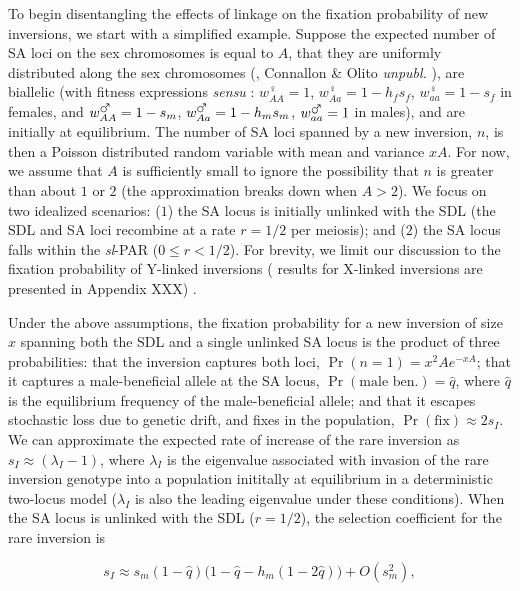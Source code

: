 \documentclass{article}
\newcommand\hl[1]{%
  \bgroup
  \hskip0pt\color{blue!80!black}%
  #1%
  \egroup
}
\begin{document}
To begin disentangling the effects of linkage on the fixation probability of new inversions, we start with a simplified example. Suppose the expected number of SA loci on the sex chromosomes is equal to $A$, that they are uniformly distributed along the sex chromosomes (\citealt{vanValenLevins1968}, \hl{Connallon \& Olito {\itshape unpubl.}}), are biallelic (with fitness expressions {\itshape sensu} \citealt{Kidwell1977}: $w^{\female}_{AA} = 1$, $w^{\female}_{Aa}=1 - h_f s_f$, $w^{\female}_{aa} = 1 - s_f$ in females, and $w^{\mars}_{AA} = 1 - s_m$, $w^{\mars}_{Aa}=1 - h_m s_m$, $w^{\mars}_{aa} = 1$ in males), and are initially at equilibrium. The number of SA loci spanned by a new inversion, $n$, is then a Poisson distributed random variable with mean and variance $xA$. For now, we assume that $A$ is sufficiently small to ignore the possibility that $n$ is greater than about $1$ or $2$ (the approximation breaks down when $A > 2$). We focus on two idealized scenarios: ($1$) the SA locus is initially unlinked with the SDL (the SDL and SA loci recombine at a rate $r = 1/2$ per meiosis); and ($2$) the SA locus falls within the {\itshape sl}-PAR ($0 \leq r < 1/2$). For brevity, we limit our discussion to the fixation probability of Y-linked inversions (\hl{results for X-linked inversions are presented in Appendix XXX)}.

Under the above assumptions, the fixation probability for a new inversion of size $x$ spanning both the SDL and a single unlinked SA locus is the product of three probabilities: that the inversion captures both loci, $\Pr(n = 1) = x^2 A e^{-xA}$; that it captures a male-beneficial allele at the SA locus, $\Pr(\text{male~ben.}) = \hat{q}$, where $\hat{q}$ is the equilibrium frequency of the male-beneficial allele; and that it escapes stochastic loss due to genetic drift, and fixes in the population, $\Pr(\text{fix}) \approx 2 s_I$. We can approximate the expected rate of increase of the rare inversion as $s_I \approx (\lambda_I - 1)$, where $\lambda_I$ is the eigenvalue associated with invasion of the rare inversion genotype into a population inititally at equilibrium in a deterministic two-locus model ($\lambda_I$ is also the leading eigenvalue under these conditions). When the SA locus is unlinked with the SDL ($r = 1/2$), the selection coefficient for the rare inversion is

\begin{equation}\label{eq:SApFix2LocUnlinked}
	s_I \approx s_m (1 - \hat{q}) \big( 1 - \hat{q} - h_m(1 - 2\hat{q}) \big) + O(s_{m}^{2}),
\end{equation}
\end{document}
